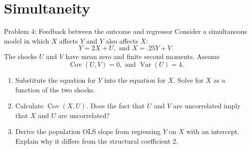 \documentclass[notes,10pt, aspectratio=169]{beamer}
\newif\ifshowsolutions
\newcommand{\Var}{\operatorname{Var}}
\newcommand{\Cov}{\operatorname{Cov}}
\newcommand{\answerpart}[1]{\textcolor{blue}{\textbf{#1.}}\,}
\begin{document}
\section{Simultaneity}
\begin{frame}{Problem 4: Feedback between the outcome and regressor}
\small
Consider a simultaneous model in which $X$ affects $Y$ and $Y$ also affects $X$:
\[
Y=2X+U,\text{ and }X=.25Y+V.
\]
The shocks $U$ and $V$ have mean zero and finite second moments. Assume
\[
\Cov(U,V)=0,\text{ and }\Var(U)=4.
\]
\begin{enumerate}
\setlength{\itemsep}{10pt}
\item Substitute the equation for $Y$ into the equation for $X$. Solve for $X$ as a function of the two shocks.
\item Calculate $\Cov(X,U)$. Does the fact that $U$ and $V$ are uncorrelated imply that $X$ and $U$ are uncorrelated?
\item Derive the population OLS slope from regressing $Y$ on $X$ with an intercept. Explain why it differs from the structural coefficient 2.
\end{enumerate}
\end{frame}

\ifshowsolutions
\begin{frame}{Solution 4: Feedback between the outcome and regressor}
\small
\answerpart{1}Substitute $Y=2X+U$ into the equation for $X$:
\begin{align*}
X&=.25(2X+U)+V=.5X+.25U+V,\\
.5X&=.25U+V
\Longrightarrow \boxed{X=.5U+2V}.
\end{align*}
\answerpart{2}The regressor contains the outcome shock. Taking its covariance with $U$ gives
\begin{align*}
\Cov(X,U)&=\Cov(.5U+2V,U)\\
&=.5\Var(U)+2\Cov(V,U)\\
&=.5(4)+2(0)=\boxed2.
\end{align*}
\answerpart{3}Consequently, the population regression slope is
\[
\alpha_X=\frac{\Cov(X,Y)}{\Var(X)}
=2+\frac{\Cov(X,U)}{\Var(X)}
=2+\frac2{\Var(X)}\ne2.
\]
A shock to $Y$ feeds back into $X$. OLS therefore combines the structural coefficient with this feedback channel, even though the two original shocks are uncorrelated.
\end{frame}
\fi
\end{document}
